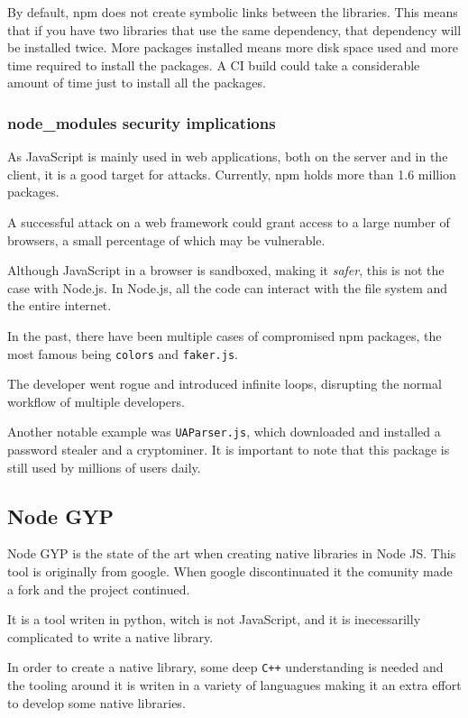 \documentclass[12pt, letterpaper]{article}
\begin{document}
\begin{multicols}{2}
    By default, npm does not create symbolic links between the libraries. This means that if you have two libraries that use the same dependency, that dependency will be installed twice. More packages installed means more disk space used and more time required to install the packages. A CI build could take a considerable amount of time just to install all the packages.

    \subsubsection{node\_modules security implications}

    As JavaScript is mainly used in web applications, both on the server and in the client, it is a good target for attacks. Currently, npm holds more than 1.6 million packages. \cite{NPMCOUNT}

    A successful attack on a web framework could grant access to a large number of browsers, a small percentage of which may be vulnerable.

    Although JavaScript in a browser is sandboxed, making it \textit{safer}, this is not the case with Node.js. In Node.js, all the code can interact with the file system and the entire internet.

    In the past, there have been multiple cases of compromised npm packages, the most famous being \verb|colors| and \verb|faker.js|. \cite{BADFAKER} \cite{VERGEFAKER}

    The developer went rogue and introduced infinite loops, disrupting the normal workflow of multiple developers.

    Another notable example was \verb|UAParser.js|, which downloaded and installed a password stealer and a cryptominer. It is important to note that this package is still used by millions of users daily.


    \subsection{Node GYP}

    Node GYP is the state of the art when creating native libraries in Node JS. This tool is originally from google. When google discontinuated it the comunity made a fork and the project continued. \cite{NODEGYP}

    It is a tool writen in python, witch is not JavaScript, and it is inecessarilly complicated to write a native library.

    In order to create a native library, some deep \verb|C++| understanding is needed and the tooling around it is writen in a variety of languagues making it an extra effort to develop some native libraries.


\end{multicols}
\end{document}
